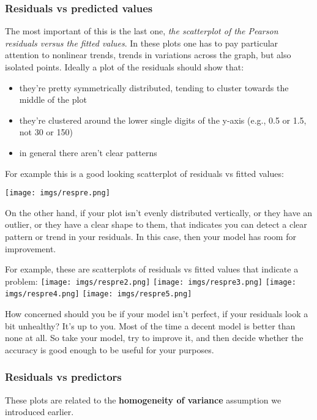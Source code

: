 \documentclass[
]{book}
\providecommand{\tightlist}{%
  \setlength{\itemsep}{0pt}\setlength{\parskip}{0pt}}
\begin{document}
\subsubsection{Residuals vs predicted values}\label{residuals-vs-predicted-values}

The most important of this is the last one, \emph{the scatterplot of the Pearson residuals versus the fitted values}. In these plots one has to pay particular attention to nonlinear trends, trends in variations across the graph, but also isolated points.
Ideally a plot of the residuals should show that:

\begin{itemize}
\tightlist
\item
  they're pretty symmetrically distributed, tending to cluster towards the middle of the plot
\item
  they're clustered around the lower single digits of the y-axis (e.g., 0.5 or 1.5, not 30 or 150)
\item
  in general there aren't clear patterns
\end{itemize}

For example this is a good looking scatterplot of residuals vs fitted values:

\texttt{[image: imgs/respre.png]}

On the other hand, if your plot isn't evenly distributed vertically, or they have an outlier, or they have a clear shape to them, that indicates you can detect a clear pattern or trend in your residuals. In this case, then your model has room for improvement.

For example, these are scatterplots of residuals vs fitted values that indicate a problem:
\texttt{[image: imgs/respre2.png]}
\texttt{[image: imgs/respre3.png]}
\texttt{[image: imgs/respre4.png]}
\texttt{[image: imgs/respre5.png]}

How concerned should you be if your model isn't perfect, if your residuals look a bit unhealthy? It's up to you. Most of the time a decent model is better than none at all. So take your model, try to improve it, and then decide whether the accuracy is good enough to be useful for your purposes.

\subsubsection{Residuals vs predictors}\label{residuals-vs-predictors}

These plots are related to the \textbf{homogeneity of variance} assumption we introduced earlier.
\end{document}
